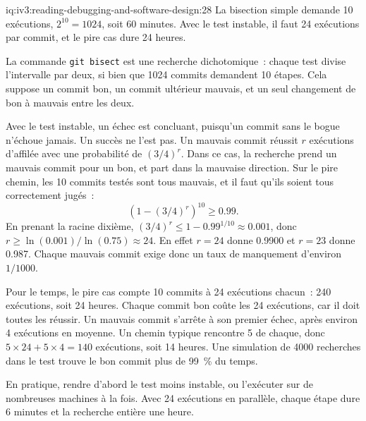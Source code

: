 \begin{solution}{iq:iv3:reading-debugging-and-software-design:28}
La bisection simple demande 10 exécutions, $2^{10} = 1024$, soit 60 minutes. Avec le test instable, il faut 24 exécutions par commit, et le pire cas dure 24 heures.

La commande \texttt{git bisect} est une recherche dichotomique~: chaque test divise l'intervalle par deux, si bien que 1024 commits demandent 10 étapes. Cela suppose un commit bon, un commit ultérieur mauvais, et un seul changement de bon à mauvais entre les deux.

Avec le test instable, un échec est concluant, puisqu'un commit sans le bogue n'échoue jamais. Un succès ne l'est pas. Un mauvais commit réussit $r$ exécutions d'affilée avec une probabilité de $(3/4)^r$. Dans ce cas, la recherche prend un mauvais commit pour un bon, et part dans la mauvaise direction. Sur le pire chemin, les 10 commits testés sont tous mauvais, et il faut qu'ils soient tous correctement jugés~:
\[
\left(1 - (3/4)^r\right)^{10} \ge 0.99.
\]
En prenant la racine dixième, $(3/4)^r \le 1 - 0.99^{1/10} \approx 0.001$, donc $r \ge \ln(0.001) / \ln(0.75) \approx 24$. En effet $r = 24$ donne 0.9900 et $r = 23$ donne 0.987. Chaque mauvais commit exige donc un taux de manquement d'environ $1/1000$.

Pour le temps, le pire cas compte 10 commits à 24 exécutions chacun~: 240 exécutions, soit 24 heures. Chaque commit bon coûte les 24 exécutions, car il doit toutes les réussir. Un mauvais commit s'arrête à son premier échec, après environ 4 exécutions en moyenne. Un chemin typique rencontre 5 de chaque, donc $5 \times 24 + 5 \times 4 = 140$ exécutions, soit 14 heures. Une simulation de 4000 recherches dans le test trouve le bon commit plus de 99~\% du temps.

En pratique, rendre d'abord le test moins instable, ou l'exécuter sur de nombreuses machines à la fois. Avec 24 exécutions en parallèle, chaque étape dure 6 minutes et la recherche entière une heure.


\end{solution}

